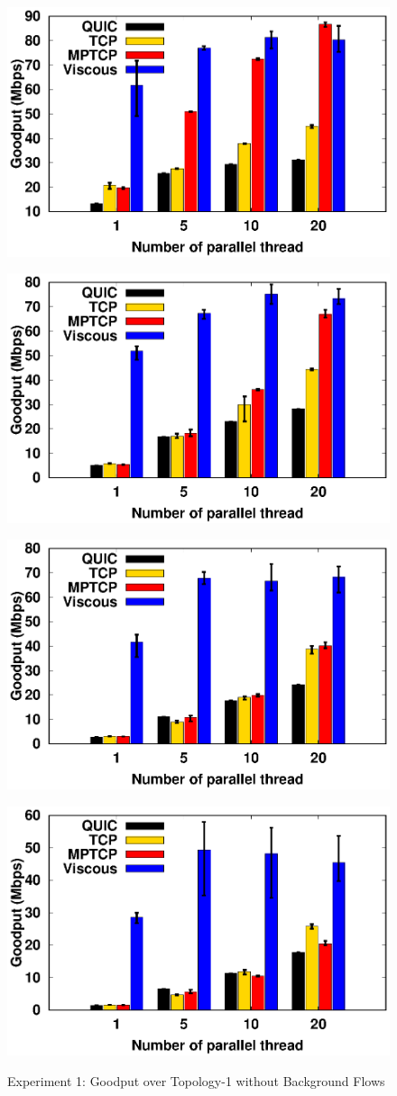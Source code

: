 \begin{figure}[!t]
    \begin{center}
        \begin{minipage}{0.45\linewidth}
            \centering
            \includegraphics[width=0.24\linewidth]{img/exp6/goodput_1}
            \label{fig:exp6_goodput_16}
        \end{minipage}
        \begin{minipage}{0.45\linewidth}
            \centering
            \includegraphics[width=0.24\linewidth]{img/exp6/goodput_5}
            \label{fig:exp6_goodput_80}
        \end{minipage}
        \begin{minipage}{0.45\linewidth}
            \centering
            \includegraphics[width=0.24\linewidth]{img/exp6/goodput_10}
            \label{fig:exp6_goodput_160}
        \end{minipage}
        \begin{minipage}{0.45\linewidth}
            \centering
            \includegraphics[width=0.24\linewidth]{img/exp6/goodput_20}
            \label{fig:exp6_goodput_320}
        \end{minipage}
        \caption{\label{fig:exp6_goodput}Experiment 1: Goodput over Topology-1 without Background Flows}
    \end{center}
\end{figure}

